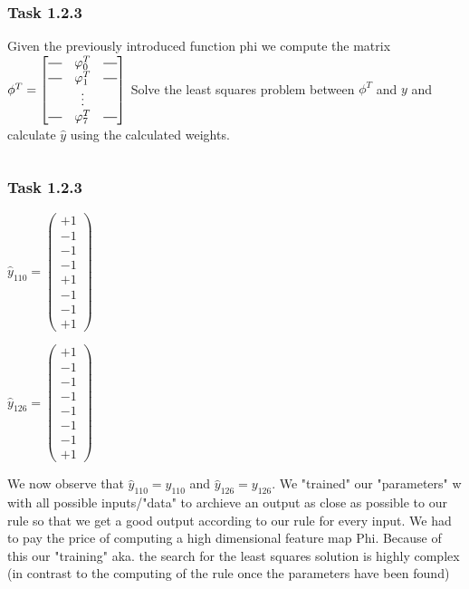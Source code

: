\documentclass[10pt,aspectratio=169,handout]{beamer}
\begin{document}
\begin{frame}
    \frametitle{Task 1.2.3}
    Given the previously introduced function phi we compute the matrix
    $\phi^T = \begin{bmatrix}
            \rule[.5ex]{2.5ex}{0.5pt} & \varphi^T_0 & \rule[.5ex]{2.5ex}{0.5pt} \\
            \rule[.5ex]{2.5ex}{0.5pt} & \varphi^T_1 & \rule[.5ex]{2.5ex}{0.5pt} \\
                                      & \vdots      &                           \\
            \rule[.5ex]{2.5ex}{0.5pt} & \varphi^T_7 & \rule[.5ex]{2.5ex}{0.5pt} \\
        \end{bmatrix}$
    Solve the least squares problem between $\phi^T$ and $y$ and calculate $\hat{y}$ using the calculated weights.
    \inputminted[bgcolor=LightGray,fontsize=\small]{python}{matrixphi.py}
\end{frame}

\begin{frame}
    \frametitle{Task 1.2.3}
    \begin{minipage}{0.45\textwidth}
        $\hat{y}_{110}= \begin{pmatrix}
                +1 \\
                -1 \\
                -1 \\
                -1 \\
                +1 \\
                -1 \\
                -1 \\
                +1
            \end{pmatrix}$
    \end{minipage}
    \begin{minipage}{0.45\textwidth}
        $\hat{y}_{126}= \begin{pmatrix}
                +1 \\
                -1 \\
                -1 \\
                -1 \\
                -1 \\
                -1 \\
                -1 \\
                +1
            \end{pmatrix}$
    \end{minipage}
    
    \vspace{1cm}
    We now observe that $\hat{y}_{110}=y_{110}$ and $\hat{y}_{126}=y_{126}$.
    We "trained" our "parameters" w with all possible inputs/"data" to archieve an output as close as possible to our rule so that we get a good output according to our rule for every input. We had to pay the price of computing a high dimensional feature map Phi. Because of this our "training" aka. the search for the least squares solution is highly complex (in contrast to the computing of the rule once the parameters have been found)
\end{frame}
\end{document}
